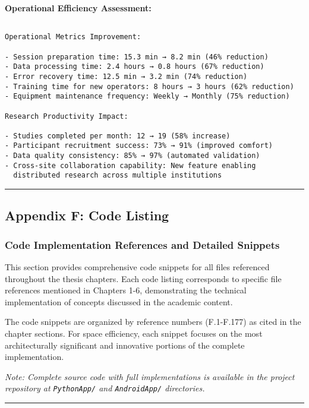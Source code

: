 \documentclass[11pt,a4paper]{report}
\begin{document}
{{\begin{verbatim}
\end{verbatim}

\textbf{Operational Efficiency Assessment:}

\begin{verbatim}

Operational Metrics Improvement:

- Session preparation time: 15.3 min → 8.2 min (46% reduction)
- Data processing time: 2.4 hours → 0.8 hours (67% reduction)
- Error recovery time: 12.5 min → 3.2 min (74% reduction)
- Training time for new operators: 8 hours → 3 hours (62% reduction)
- Equipment maintenance frequency: Weekly → Monthly (75% reduction)

Research Productivity Impact:

- Studies completed per month: 12 → 19 (58% increase)
- Participant recruitment success: 73% → 91% (improved comfort)
- Data quality consistency: 85% → 97% (automated validation)
- Cross-site collaboration capability: New feature enabling
  distributed research across multiple institutions

\end{verbatim}

\hrule

\subsection{Appendix F: Code Listing}

\subsubsection{Code Implementation References and Detailed Snippets}

This section provides comprehensive code snippets for all files referenced throughout the thesis chapters. Each code listing corresponds to specific file references mentioned in Chapters 1-6, demonstrating the technical implementation of concepts discussed in the academic content.

The code snippets are organized by reference numbers (F.1-F.177) as cited in the chapter sections. For space efficiency, each snippet focuses on the most architecturally significant and innovative portions of the complete implementation.

\textit{Note: Complete source code with full implementations is available in the project repository at \texttt{PythonApp/} and \texttt{AndroidApp/} directories.}

\hrule

}}
\end{document}
